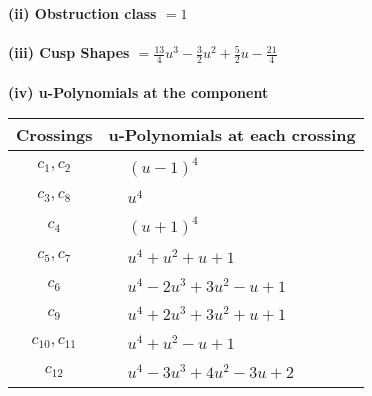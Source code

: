 \documentclass[1p]{elsarticle_modified}
\theoremstyle{definition}
\begin{document}
\flushleft \textbf{(ii) Obstruction class $= 1$}\\~\\
\flushleft \textbf{(iii) Cusp Shapes $= \frac{13}{4} u^3-\frac{3}{2} u^2+\frac{5}{2} u-\frac{21}{4}$}\\~\\
\newpage\renewcommand{\arraystretch}{1}
\flushleft \textbf{(iv) u-Polynomials at the component}\newline \\
\begin{tabular}{m{50pt}|m{274pt}}
Crossings & \hspace{64pt}u-Polynomials at each crossing \\
\hline $$\begin{aligned}c_{1},c_{2}\end{aligned}$$&$\begin{aligned}
&(u-1)^4
\end{aligned}$\\
\hline $$\begin{aligned}c_{3},c_{8}\end{aligned}$$&$\begin{aligned}
&u^4
\end{aligned}$\\
\hline $$\begin{aligned}c_{4}\end{aligned}$$&$\begin{aligned}
&(u+1)^4
\end{aligned}$\\
\hline $$\begin{aligned}c_{5},c_{7}\end{aligned}$$&$\begin{aligned}
&u^4+u^2+u+1
\end{aligned}$\\
\hline $$\begin{aligned}c_{6}\end{aligned}$$&$\begin{aligned}
&u^4-2 u^3+3 u^2- u+1
\end{aligned}$\\
\hline $$\begin{aligned}c_{9}\end{aligned}$$&$\begin{aligned}
&u^4+2 u^3+3 u^2+u+1
\end{aligned}$\\
\hline $$\begin{aligned}c_{10},c_{11}\end{aligned}$$&$\begin{aligned}
&u^4+u^2- u+1
\end{aligned}$\\
\hline $$\begin{aligned}c_{12}\end{aligned}$$&$\begin{aligned}
&u^4-3 u^3+4 u^2-3 u+2
\end{aligned}$\\
\hline
\end{tabular}\\~\\
\end{document}
